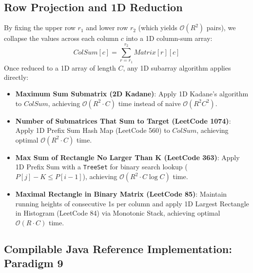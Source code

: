 \documentclass[10pt,journal,compsoc,onecolumn]{IEEEtran}
\begin{document}
\subsection{Row Projection and 1D Reduction}
By fixing the upper row $r_1$ and lower row $r_2$ (which yields $\mathcal{O}(R^2)$ pairs), we collapse the values across each column $c$ into a 1D column-sum array:
\begin{equation}
ColSum[c] = \sum_{r=r_1}^{r_2} Matrix[r][c]
\end{equation}
Once reduced to a 1D array of length $C$, any 1D subarray algorithm applies directly:
\begin{itemize}
    \item \textbf{Maximum Sum Submatrix (2D Kadane)}: Apply 1D Kadane's algorithm to $ColSum$, achieving $\mathcal{O}(R^2 \cdot C)$ time instead of naive $\mathcal{O}(R^2 C^2)$.
    \item \textbf{Number of Submatrices That Sum to Target (LeetCode 1074)}: Apply 1D Prefix Sum Hash Map (LeetCode 560) to $ColSum$, achieving optimal $\mathcal{O}(R^2 \cdot C)$ time.
    \item \textbf{Max Sum of Rectangle No Larger Than K (LeetCode 363)}: Apply 1D Prefix Sum with a \texttt{TreeSet} for binary search lookup ($P[j] - K \le P[i-1]$), achieving $\mathcal{O}(R^2 \cdot C \log C)$ time.
    \item \textbf{Maximal Rectangle in Binary Matrix (LeetCode 85)}: Maintain running heights of consecutive 1s per column and apply 1D Largest Rectangle in Histogram (LeetCode 84) via Monotonic Stack, achieving optimal $\mathcal{O}(R \cdot C)$ time.
\end{itemize}

\subsection{Compilable Java Reference Implementation: Paradigm 9}
\end{document}

